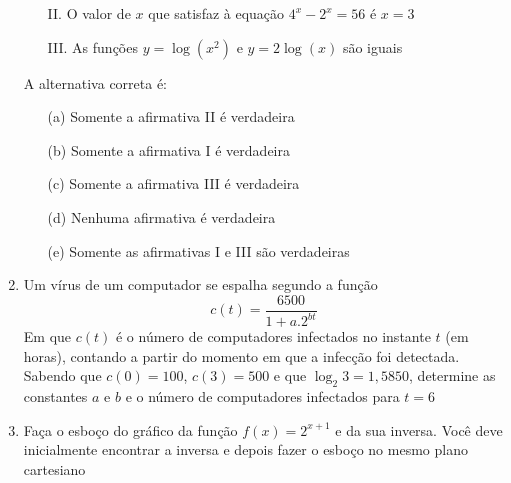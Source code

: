 \begin{enumerate}
\begin{enumerate}
		\item[II.] O valor de $x$ que satisfaz à equação $4^x-2^x = 56$ é $x = 3$

		\item[III.] As funções $y=\log (x^2)$ e $y=2\log (x)$ são iguais
	\end{enumerate}

	A alternativa correta é:
	\begin{enumerate}
		\item[(a)] Somente a afirmativa II é verdadeira
		\item[(b)] Somente a afirmativa I é verdadeira
		\item[(c)] Somente a afirmativa III é verdadeira
		\item[(d)] Nenhuma afirmativa é verdadeira
		\item[(e)] Somente as afirmativas I e III são verdadeiras
	\end{enumerate}
 \item  Um vírus de um computador se espalha segundo a função $$c(t)= \frac{6500}{1+a.2^{bt}}$$
    Em que $c(t)$ é o número de computadores infectados no instante $t$ (em horas), contando a partir do momento em que a infecção foi detectada. Sabendo que $c(0)=100$, $c(3)=500$ e que $\log_2 3=1,5850$, determine as constantes $a$ e $b$ e o número de computadores infectados para $t=6$

    \item Faça o esboço do gráfico da função $f(x)=2^{x+1}$ e da sua inversa. Você deve inicialmente encontrar a inversa e depois fazer o esboço no mesmo plano cartesiano
\end{enumerate}
